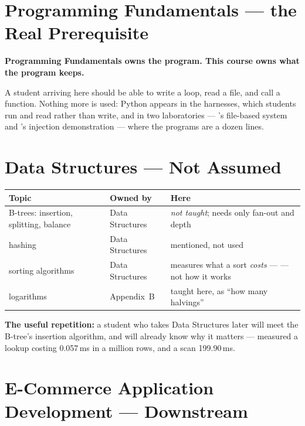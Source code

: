 \section{Programming Fundamentals --- the Real Prerequisite}

\begin{conceptbox}
\textbf{Programming Fundamentals owns the program. This course owns what the
program keeps.}

\smallskip
A student arriving here should be able to write a loop, read a file, and call
a function. Nothing more is used: Python appears in the harnesses, which
students run and read rather than write, and in two laboratories ---
's file-based system and 's injection
demonstration --- where the programs are a dozen lines.
\end{conceptbox}

\section{Data Structures --- Not Assumed}

\begin{longtable}{@{}L{5.4cm}L{3.4cm}L{5.6cm}@{}}
\toprule
{}
\textbf{Topic} & \textbf{Owned by} & \textbf{Here} \\
\midrule
\endhead
B-trees: insertion, splitting, balance & Data Structures & \emph{not taught};
   needs only fan-out and depth \\
hashing & Data Structures & mentioned, not used \\
sorting algorithms & Data Structures &  measures what a sort
  \emph{costs} ---  --- not how it works \\
logarithms & Appendix~B & taught here, as ``how many halvings'' \\
\bottomrule
\end{longtable}

\smallskip
\textbf{The useful repetition:} a student who takes Data Structures later will
meet the B-tree's insertion algorithm, and will already know why it matters ---
 measured a lookup costing 0.057\,ms in a million rows, and a
scan 199.90\,ms.

\section{E-Commerce Application Development --- Downstream}

